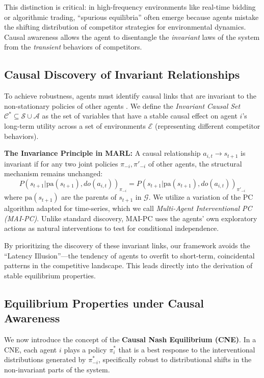 This distinction is critical: in high-frequency environments like real-time bidding or algorithmic trading, ``spurious equilibria'' often emerge because agents mistake the shifting distribution of competitor strategies for environmental dynamics. Causal awareness allows the agent to disentangle the \textit{invariant} laws of the system from the \textit{transient} behaviors of competitors.

\subsection{Causal Discovery of Invariant Relationships}

To achieve robustness, agents must identify causal links that are invariant to the non-stationary policies of other agents \cite{peters2016causal}. We define the \textit{Invariant Causal Set} $\mathcal{C}^* \subseteq \mathcal{S} \cup \mathcal{A}$ as the set of variables that have a stable causal effect on agent $i$'s long-term utility across a set of environments $\mathcal{E}$ (representing different competitor behaviors).

\textbf{The Invariance Principle in MARL:} A causal relationship $a_{i,t} \to s_{t+1}$ is invariant if for any two joint policies $\pi_{-i}, \pi'_{-i}$ of other agents, the structural mechanism remains unchanged:
\begin{equation}
P(s_{t+1} | \text{pa}(s_{t+1}), do(a_{i,t}))_{\pi_{-i}} = P(s_{t+1} | \text{pa}(s_{t+1}), do(a_{i,t}))_{\pi'_{-i}}
\end{equation}
where $\text{pa}(s_{t+1})$ are the parents of $s_{t+1}$ in $\mathcal{G}$. We utilize a variation of the PC algorithm \cite{spirtes2000causation} adapted for time-series, which we call \textit{Multi-Agent Interventional PC (MAI-PC)}. Unlike standard discovery, MAI-PC uses the agents' own exploratory actions as natural interventions to test for conditional independence. 

By prioritizing the discovery of these invariant links, our framework avoids the ``Latency Illusion''---the tendency of agents to overfit to short-term, coincidental patterns in the competitive landscape. This leads directly into the derivation of stable equilibrium properties.

\subsection{Equilibrium Properties under Causal Awareness}

We now introduce the concept of the \textbf{Causal Nash Equilibrium (CNE)}. In a CNE, each agent $i$ plays a policy $\pi^*_i$ that is a best response to the interventional distributions generated by $\pi^*_{-i}$, specifically robust to distributional shifts in the non-invariant parts of the system.


